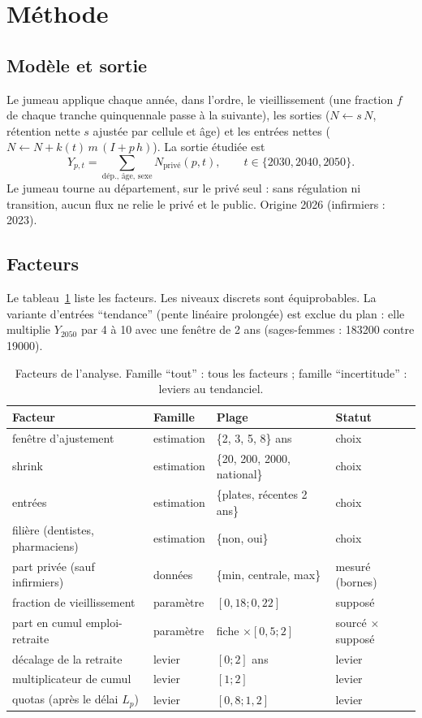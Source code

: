 \section{Méthode}
\subsection{Modèle et sortie}
Le jumeau applique chaque année, dans l'ordre, le vieillissement (une fraction $f$ de chaque tranche quinquennale
passe à la suivante), les sorties ($N \leftarrow s\,N$, rétention nette $s$ ajustée par cellule et âge) et les
entrées nettes ($N \leftarrow N + k(t)\,m\,(I + p\,h)$). La sortie étudiée est
\[
  Y_{p,t} = \sum_{\text{dép., âge, sexe}} N_{\text{privé}}(p, t), \qquad t \in \{2030, 2040, 2050\}.
\]
Le jumeau tourne au département, sur le privé seul : sans régulation ni transition, aucun flux ne relie le privé et
le public. Origine 2026 (infirmiers : 2023).

\subsection{Facteurs}
Le tableau~\ref{a5-tab:fac} liste les facteurs. Les niveaux discrets sont équiprobables\suppose{}. La variante
d'entrées \enquote{tendance} (pente linéaire prolongée) est exclue du plan : elle multiplie $Y_{2050}$ par 4 à
10\mesure{} avec une fenêtre de 2 ans (sages-femmes : \num{183200} contre \num{19000}\mesure{}).

\begin{table}[h]\centering\small
\begin{tabular}{llll}
\toprule
Facteur & Famille & Plage & Statut \\
\midrule
fenêtre d'ajustement & estimation & \{2, 3, 5, 8\} ans & choix \\
shrink & estimation & \{20, 200, 2000, national\} & choix \\
entrées & estimation & \{plates, récentes 2 ans\} & choix \\
filière (dentistes, pharmaciens) & estimation & \{non, oui\} & choix \\
part privée (sauf infirmiers) & données & \{min, centrale, max\} & mesuré (bornes) \\
fraction de vieillissement & paramètre & $[0{,}18 ; 0{,}22]$ & supposé \\
part en cumul emploi-retraite & paramètre & fiche $\times [0{,}5 ; 2]$ & sourcé $\times$ supposé \\
décalage de la retraite & levier & $[0 ; 2]$ ans & levier \\
multiplicateur de cumul & levier & $[1 ; 2]$ & levier \\
quotas (après le délai $L_p$) & levier & $[0{,}8 ; 1{,}2]$ & levier \\
\bottomrule
\end{tabular}
\caption{Facteurs de l'analyse. Famille \enquote{tout} : tous les facteurs ; famille \enquote{incertitude} : leviers au
tendanciel.}\label{a5-tab:fac}
\end{table}

